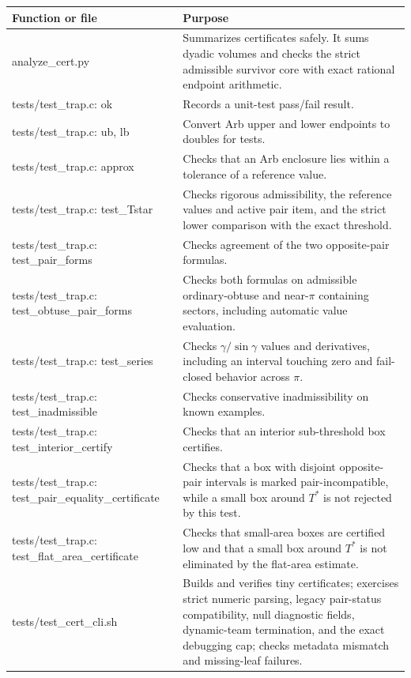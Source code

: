 \documentclass[11pt]{article}
\begin{document}
\begin{longtable}{>{\ttfamily}p{}p{}}
\toprule
Function or file & Purpose \\
\midrule
\endhead
analyze\_cert.py & Summarizes certificates safely.  It sums dyadic volumes and checks the strict admissible survivor core with exact rational endpoint arithmetic. \\
tests/test\_trap.c: ok & Records a unit-test pass/fail result. \\
tests/test\_trap.c: ub, lb & Convert Arb upper and lower endpoints to doubles for tests. \\
tests/test\_trap.c: approx & Checks that an Arb enclosure lies within a tolerance of a reference value. \\
tests/test\_trap.c: test\_Tstar & Checks rigorous admissibility, the reference values and active pair item, and the strict lower comparison with the exact threshold. \\
tests/test\_trap.c: test\_pair\_forms & Checks agreement of the two opposite-pair formulas. \\
tests/test\_trap.c: test\_obtuse\_pair\_forms & Checks both formulas on admissible ordinary-obtuse and near-\(\pi\) containing sectors, including automatic value evaluation. \\
tests/test\_trap.c: test\_series & Checks \(\gamma/\sin\gamma\) values and derivatives, including an interval touching zero and fail-closed behavior across \(\pi\). \\
tests/test\_trap.c: test\_inadmissible & Checks conservative inadmissibility on known examples. \\
tests/test\_trap.c: test\_interior\_certify & Checks that an interior sub-threshold box certifies. \\
tests/test\_trap.c: test\_pair\_\allowbreak equality\_\allowbreak certificate & Checks that a box with disjoint opposite-pair intervals is marked pair-incompatible, while a small box around \(T^\ast\) is not rejected by this test. \\
tests/test\_trap.c: test\_flat\_\allowbreak area\_\allowbreak certificate & Checks that small-area boxes are certified low and that a small box around \(T^\ast\) is not eliminated by the flat-area estimate. \\
tests/test\_cert\_cli.sh & Builds and verifies tiny certificates; exercises strict numeric parsing, legacy pair-status compatibility, null diagnostic fields, dynamic-team termination, and the exact debugging cap; checks metadata mismatch and missing-leaf failures. \\
\bottomrule
\end{longtable}
\end{document}
